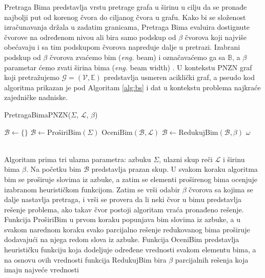 \documentclass[12pt,oneside]{memoir}
\begin{document}
Pretraga Bima predstavlja vrstu pretrage grafa u širinu u cilju da
se pronađe najbolji put od korenog čvora do ciljanog čvora u grafu. Kako bi se složenost izračunavanja držala u
zadatim granicama, Pretraga Bima evaluira dostignute čvorove na određenom nivou ali bira samo podskup od $\beta$
čvorova koji najviše obećavaju i sa tim podskupom čvorova napreduje dalje u pretrazi. Izabrani podskup od $\beta$ čvorova
zvaćemo bim (\textit{eng.} beam) i označavaćemo ga sa $\mathbb{B}$, a $\beta$ parametar ćemo zvati širina bima (\textit{eng.} beam width) \cite{SCSBS}.
U kontekstu PNZN graf koji pretražujemo $\mathcal{G}=(\mathcal{V},\mathbb{E})$ predstavlja usmeren aciklički graf, a  
pseudo kod algoritma prikazan je pod Algoritam \ref{alg:bs} i dat u kontekstu problema najkraće
zajedničke nadniske. 
\\
\begin{algorithm}
  \caption{PretragaBimaPNZN($\Sigma$, $\mathcal{L}$, $\beta$)}
  \label{alg:bs}
  \begin{algorithmic}[1]
  \State $\mathcal{B} \gets \{ \}$
   
  \State $\mathcal{B} \gets \textrm{ProširiBim}(\Sigma)$
  \State $\textrm{OceniBim}(\mathcal{B}, \mathcal{L})$
  \State $\mathcal{B} \gets \textrm{RedukujBim}(\mathcal{B}, \beta)$
    \State \Return $\omega$
    \EndIf
  \EndFor
  \EndWhile
  \end{algorithmic}
  \end{algorithm}
\\
Algoritam prima tri ulazna parametra: azbuku $\Sigma$, ulazni skup reči $\mathcal{L}$ i širinu bima $\beta$.
Na početku bim $\mathcal{B}$ predstavlja prazan skup. U svakom koraku algoritma bim se proširuje slovima iz azbuke,
a zatim se elementi proširenog bima ocenjuje izabranom heurističkom funkcijom. Zatim se vrši odabir $\beta$ čvorova
sa kojima se dalje nastavlja pretraga, i vrši se provera da li neki čvor u bimu predstavlja rešenje problema,
ako takav čvor postoji algoritam vraća pronađeno rešenje. Funkcija ProširiBim u prvom koraku popunjava bim slovima
iz azbuke, a u svakom narednom koraku svako parcijalno rešenje redukovanog bima proširuje dodavajući na njega redom
slova iz azbuke. Funkcija OceniBim predstavlja heurističku funkciju koja dodeljuje određene vrednosti svakom elementu bima,
a na osnovu ovih vrednosti funkcija RedukujBim bira $\beta$ parcijalnih rešenja koja imaju najveće vrednosti
\end{document}
